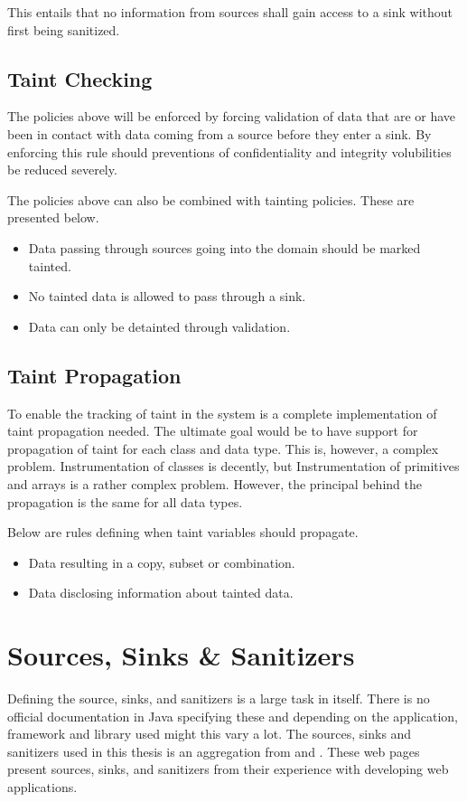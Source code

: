 This entails that no information from sources shall gain access to a sink without first being sanitized.



\subsection{Taint Checking}
The policies above will be enforced by forcing validation of data that are or have been in contact with data coming from a source before they enter a sink. By enforcing this rule should preventions of confidentiality and integrity volubilities be reduced severely.

The policies above can also be combined with tainting policies. These are presented below.

\hfill
\begin{itemize}
    \item Data passing through sources going into the domain should be marked tainted.
    \item No tainted data is allowed to pass through a sink.
    \item Data can only be detainted through validation.
\end{itemize}
\hfill



\subsection{Taint Propagation}
To enable the tracking of taint in the system is a complete implementation of taint propagation needed. The ultimate goal would be to have support for propagation of taint for each class and data type. This is, however, a complex problem. Instrumentation of classes is decently, but Instrumentation of primitives and arrays is a rather complex problem. However, the principal behind the propagation is the same for all data types. 

Below are rules defining when taint variables should propagate.

\hfill
\begin{itemize}
    \item Data resulting in a copy, subset or combination.
    \item Data disclosing information about tainted data.
\end{itemize}
\hfill



\section{Sources, Sinks \& Sanitizers}
Defining the source, sinks, and sanitizers is a large task in itself. There is no official documentation in Java specifying these and depending on the application, framework and library used might this vary a lot.  The sources, sinks and sanitizers used in this thesis is an aggregation from \textcite{sssCodeMaster} and \textcite{sssOWASP}. These web pages present sources, sinks, and sanitizers from their experience with developing web applications. 



